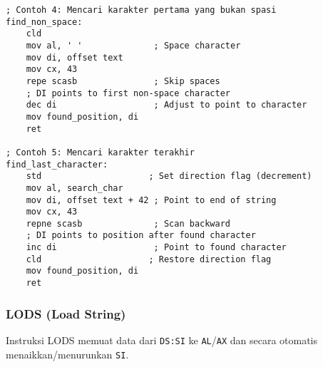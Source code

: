 \documentclass[../main.tex]{subfiles}
\begin{document}
\begin{lstlisting}[language={[x86masm]Assembler}, caption=Contoh Instruksi SCAS, label={lst:scas-examples}]
; Contoh 4: Mencari karakter pertama yang bukan spasi
find_non_space:
    cld
    mov al, ' '              ; Space character
    mov di, offset text
    mov cx, 43
    repe scasb               ; Skip spaces
    ; DI points to first non-space character
    dec di                   ; Adjust to point to character
    mov found_position, di
    ret

; Contoh 5: Mencari karakter terakhir
find_last_character:
    std                     ; Set direction flag (decrement)
    mov al, search_char
    mov di, offset text + 42 ; Point to end of string
    mov cx, 43
    repne scasb              ; Scan backward
    ; DI points to position after found character
    inc di                   ; Point to found character
    cld                     ; Restore direction flag
    mov found_position, di
    ret
                \end{lstlisting}

            \subsubsection{LODS (Load String)}
                Instruksi LODS memuat data dari \texttt{DS:SI} ke \texttt{AL}/\texttt{AX} dan secara otomatis menaikkan/menurunkan \texttt{SI}.
\end{document}
